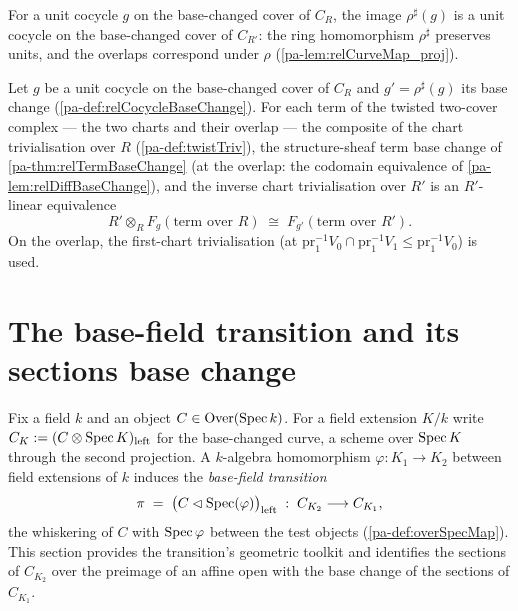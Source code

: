 \begin{definition}
  \label{pa-def:relCocycleBaseChange}
  \leanok

  For a unit cocycle \(g\) on the base-changed cover of \(C_R\), the image
  \(\rho^{\sharp}(g)\) is a unit cocycle on the base-changed cover of \(C_{R'}\): the
  ring homomorphism \(\rho^{\sharp}\) preserves units, and the overlaps correspond under
  \(\rho\) (\ref{pa-lem:relCurveMap_proj}).
\end{definition}

\begin{definition}
  \label{pa-def:relTwistTermBaseChange}
  \leanok

  Let \(g\) be a unit cocycle on the base-changed cover of \(C_R\) and
  \(g' = \rho^{\sharp}(g)\) its base change (\ref{pa-def:relCocycleBaseChange}). For each
  term of the twisted two-cover complex --- the two charts and their overlap --- the
  composite of the chart trivialisation over \(R\) (\ref{pa-def:twistTriv}), the
  structure-sheaf term base change of \ref{pa-thm:relTermBaseChange} (at the overlap: the
  codomain equivalence of \ref{pa-lem:relDiffBaseChange}), and the inverse chart
  trivialisation over \(R'\) is an \(R'\)-linear equivalence
  \[
    R' \otimes_R F_g(\text{term over } R) \;\cong\; F_{g'}(\text{term over } R') .
  \]
  On the overlap, the first-chart trivialisation (at
  \(\mathrm{pr}_1^{-1}V_0 \cap \mathrm{pr}_1^{-1}V_1 \le \mathrm{pr}_1^{-1}V_0\)) is
  used.
\end{definition}

\section{The base-field transition and its sections base change}
\label{pa-sec:base_field_transition}

Fix a field \(k\) and an object \(C \in \mathrm{Over}(\operatorname{Spec} k)\). For a field extension \(K/k\)
write \(C_K := (C \otimes \operatorname{Spec} K)_{\mathrm{left}}\) for the base-changed curve, a scheme
over \(\operatorname{Spec} K\) through the second projection. A \(k\)-algebra homomorphism
\(\varphi : K_1 \to K_2\) between field extensions of \(k\) induces the
\emph{base-field transition}
\[
  \pi \;=\; \bigl(C \lhd \operatorname{Spec}(\varphi)\bigr)_{\mathrm{left}} \;:\; C_{K_2}
  \longrightarrow C_{K_1},
\]
the whiskering of \(C\) with \(\operatorname{Spec}\varphi\) between the test objects
(\ref{pa-def:overSpecMap}). This section provides the transition's geometric toolkit and
identifies the sections of \(C_{K_2}\) over the preimage of an affine open with the base
change of the sections of \(C_{K_1}\).

